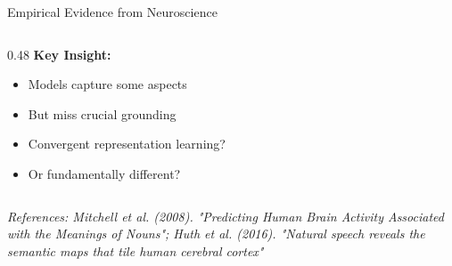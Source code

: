 \documentclass[aspectratio=169]{beamer}
\begin{document}
\begin{frame}[shrink=10]{Empirical Evidence from Neuroscience 🧬}
\begin{columns}[T]
\begin{column}{0.48\textwidth}
\vspace{1em}
\textbf{Key Insight:}
\begin{itemize}\setlength{\itemsep}{0pt}
    \item Models capture some aspects
    \item But miss crucial grounding
    \item Convergent representation learning?
    \item Or fundamentally different?
\end{itemize}
\end{column}
\end{columns}

\vspace{0.5em}
\small
\textit{References: Mitchell et al. (2008). "Predicting Human Brain Activity Associated with the Meanings of Nouns"; Huth et al. (2016). "Natural speech reveals the semantic maps that tile human cerebral cortex"}
\end{frame}
\end{document}
